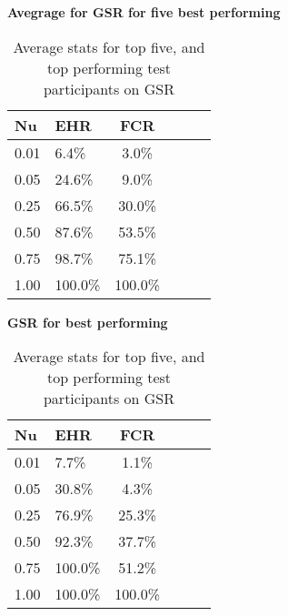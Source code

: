 \begin{table}[h]
  \centering
  \textbf{Avegrage for GSR for five best performing}\vspace{2pt}
  \begin{tabularx}{\columnwidth}{XXcXXc}
    \toprule
    \textbf{Nu} & \textbf{EHR} & \textbf{FCR} \\
    \midrule
    0.01        & 6.4\%        & 3.0\%        \\ \hline
    0.05        & 24.6\%       & 9.0\%        \\ \hline
    0.25        & 66.5\%       & 30.0\%       \\ \hline
    0.50        & 87.6\%       & 53.5\%       \\ \hline
    0.75        & 98.7\%       & 75.1\%       \\ \hline
    1.00        & 100.0\%      & 100.0\%      \\ \hline
    \bottomrule
  \end{tabularx}

  \textbf{GSR for best performing}\vspace{2pt}
  \begin{tabularx}{\columnwidth}{XXcXXc}
    \toprule
    \textbf{Nu} & \textbf{EHR} & \textbf{FCR} \\
    \midrule
    0.01        & 7.7\%        & 1.1\%        \\ \hline
    0.05        & 30.8\%       & 4.3\%        \\ \hline
    0.25        & 76.9\%       & 25.3\%       \\ \hline
    0.50        & 92.3\%       & 37.7\%       \\ \hline
    0.75        & 100.0\%      & 51.2\%       \\ \hline
    1.00        & 100.0\%      & 100.0\%      \\ \hline
    \bottomrule
  \end{tabularx}
  \caption{Average stats for top five, and top performing test participants on GSR}
  \label{tab:best_five_avg_stats}
\end{table}